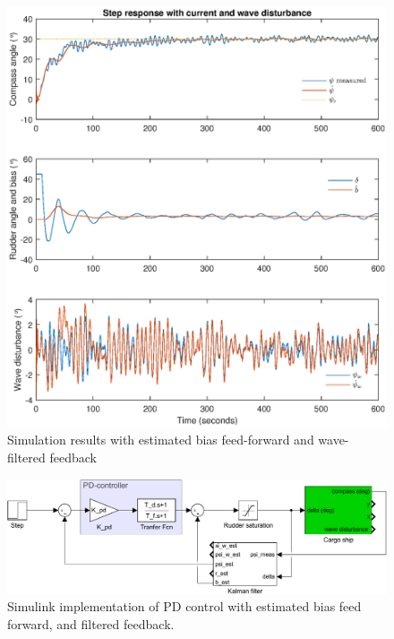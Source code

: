 \begin{figure}
    \centering
    \includegraphics[width=\textwidth]{images/oppg5/5e.eps}
    \caption{Simulation results with estimated bias feed-forward and wave-filtered feedback}
    \label{fig:5e}
\end{figure}

\begin{figure}
    \centering
    \includegraphics[width=\textwidth]{images/oppg5/bias_FF_and_filtered_FB.pdf}
    \caption{Simulink implementation of PD control with estimated bias feed forward, and filtered feedback.}
    \label{fig:filtered_fb}
\end{figure}
